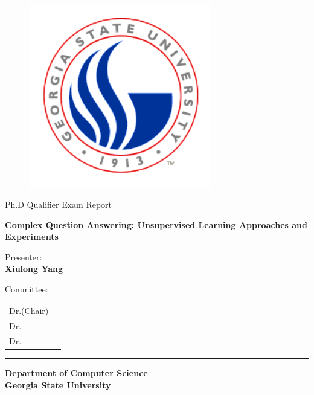 \documentclass[11pt, english]{article}
\begin{document}
\setlength\parskip{.3\baselineskip}
\begin{titlepage}

\begin{center}
\begin{figure}[htb]
\begin{center}
\includegraphics[width=8cm]{gsu_c_logo}
\end{center}
\end{figure}

\vspace*{0.1in}
\begin{LARGE}
Ph.D Qualifier Exam Report\\
\end{LARGE}
\vspace*{0.3in}
\begin{LARGE}
\textbf{Complex Question Answering: Unsupervised Learning Approaches and Experiments} \\
\end{LARGE}
\vspace*{0.3in}
\begin{Large}
  Presenter: \\
\vspace*{0.1in}
\textbf{Xiulong Yang}\\
\end{Large}

\vspace*{0.3in}
\vspace*{0.1in}
\begin{Large}
Committee:\\
\vspace*{0.1in}

\begin{tabular}{lc}
Dr.(Chair) \\
Dr.  \\
Dr.  
\end{tabular}
\end{Large}
\end{center}

\rule{160mm}{0.1mm}

\begin{center}
\begin{large}
\textbf{Department of Computer Science} \\
\textbf{Georgia State University}
\end{large}
\end{center}

\end{titlepage}
  
\end{document}
